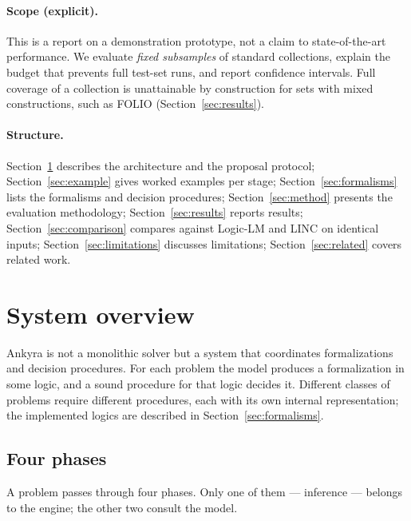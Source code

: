 \documentclass[11pt,a4paper]{article}
\begin{document}
\paragraph{Scope (explicit).} This is a report on a demonstration prototype, not a claim to
state-of-the-art performance. We evaluate \emph{fixed subsamples} of standard collections,
explain the budget that prevents full test-set runs, and report confidence intervals. Full
coverage of a collection is unattainable by construction for sets with mixed constructions,
such as FOLIO (Section~\ref{sec:results}).

\paragraph{Structure.} Section~\ref{sec:system} describes the architecture and the proposal
protocol; Section~\ref{sec:example} gives worked examples per stage;
Section~\ref{sec:formalisms} lists the formalisms and decision procedures;
Section~\ref{sec:method} presents the evaluation methodology; Section~\ref{sec:results}
reports results; Section~\ref{sec:comparison} compares against Logic-LM and LINC on identical
inputs; Section~\ref{sec:limitations} discusses limitations;
Section~\ref{sec:related} covers related work.

\section{System overview}
\label{sec:system}

Ankyra is not a monolithic solver but a system that coordinates formalizations and decision
procedures. For each problem the model produces a formalization in some logic, and a sound
procedure for that logic decides it. Different classes of problems require different
procedures, each with its own internal representation; the implemented logics are described
in Section~\ref{sec:formalisms}.

\subsection{Four phases}

A problem passes through four phases. Only one of them --- inference --- belongs to the
engine; the other two consult the model.
\end{document}

